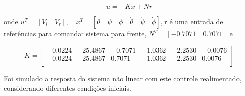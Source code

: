 \documentclass[10pt]{article}
\begin{document}
\begin{equation}
    u = -Kx + Nr
\end{equation}

onde $u^T = [V_l \quad V_r], \quad x^T = [\theta \quad \psi \quad \phi \quad \dot{\theta} \quad \dot{\psi} \quad \dot{\phi}]$,
r é uma entrada de referências para comandar sistema para frente, $N^T = [-0.7071 \quad 0.7071]$ e

\begin{equation}
    K = \begin{bmatrix}
    -0.0224 & -25.4867 & -0.7071 & -1.0362 & -2.2530 & -0.0076 \\
    -0.0224 & -25.4867 & 0.7071 & -1.0362 & -2.2530 & 0.0076 \\
\end{bmatrix}
\end{equation}

Foi simulado a resposta do sistema não linear com este controle realimentado,
considerando diferentes condições iniciais.
\end{document}
